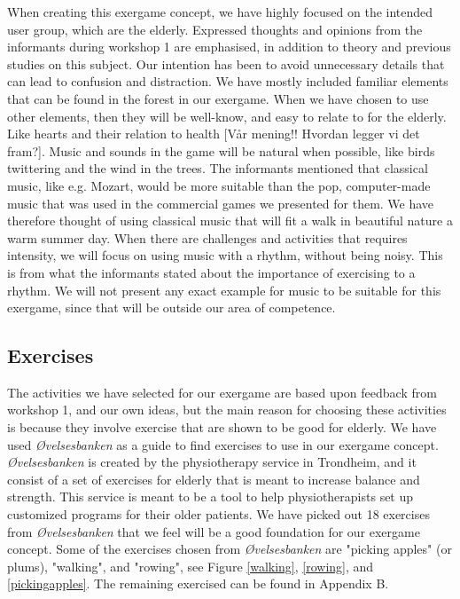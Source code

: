 When creating this exergame concept, we have highly focused on the intended user group, which are the elderly. Expressed thoughts and opinions from the informants during workshop 1 are emphasised, in addition to theory and previous studies on this subject. Our intention has been to avoid unnecessary details that can lead to confusion and distraction. We have mostly included familiar elements that can be found in the forest in our exergame. When we have chosen to use other elements,  then they will be well-know, and easy to relate to for the elderly. Like hearts and their relation to health [Vår mening!! Hvordan legger vi det fram?]. Music and sounds in the game will be natural when possible, like birds twittering and the wind in the trees. The informants mentioned that classical music, like e.g. Mozart, would be more suitable than the pop, computer-made music that was used in the commercial games we presented for them. We have therefore thought of using classical music that will fit a walk in beautiful nature a warm summer day. When there are challenges and activities that requires intensity, we will focus on using music with a rhythm, without being noisy. This is from what the informants stated about the importance of exercising to a rhythm. We will not present any exact example for music to be suitable for this exergame, since that will be outside our area of competence.           

\subsection{Exercises}
The activities we have selected for our exergame are based upon feedback from workshop 1, and our own ideas, but the main reason for choosing these activities is because they involve exercise that are shown to be good for elderly. We have used \emph{Øvelsesbanken} \cite{eldretrening} as a guide to find exercises to use in our exergame concept. \emph{Øvelsesbanken} is created by the physiotherapy service in Trondheim, and it consist of a set of exercises for elderly that is meant to increase balance and strength. This service is meant to be a tool to help physiotherapists set up customized programs for their older patients. We have picked out 18 exercises from \emph{Øvelsesbanken} that we feel will be a good foundation for our exergame concept. Some of the exercises chosen from \emph{Øvelsesbanken} are "picking apples" (or plums), "walking", and "rowing", see Figure \ref{walking}, \ref{rowing}, and \ref{pickingapples}. The remaining exercised can be found in Appendix B.        

